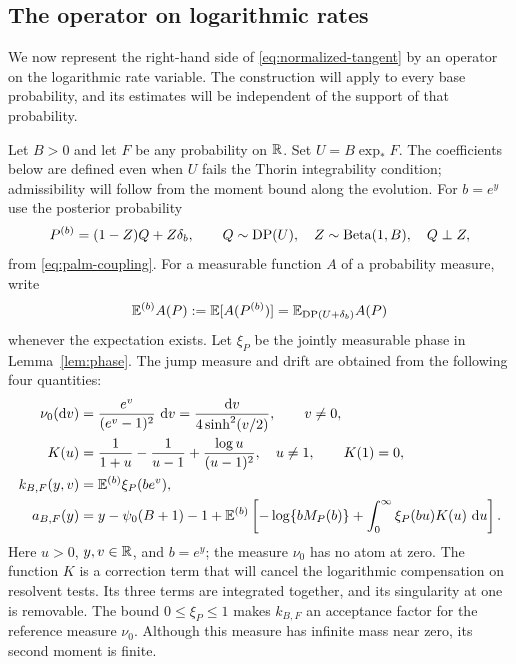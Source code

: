 \subsection{The operator on logarithmic rates}
\label{sec:generator}

We now represent the right-hand side of \eqref{eq:normalized-tangent} by an operator on the logarithmic rate variable.
The construction will apply to every base probability, and its estimates will be independent of the support of that probability.

Let $B>0$ and let $F$ be any probability on $\mathbb R$.
Set $U=B\exp_*F$.
The coefficients below are defined even when $U$ fails the Thorin integrability condition; admissibility will follow from the moment bound along the evolution.
For $b=e^y$ use the posterior probability
\[
 P^{(b)}=(1-Z)Q+Z\delta_b,\qquad
 Q\sim\operatorname{DP}(U),\quad Z\sim\operatorname{Beta}(1,B),\quad Q\perp Z,
\]
from \eqref{eq:palm-coupling}.
For a measurable function $A$ of a probability measure, write
\[
 \mathbb E^{(b)}A(P):=\mathbb E[A(P^{(b)})]
             =\mathbb E_{\operatorname{DP}(U+\delta_b)}A(P)
\]
whenever the expectation exists.
Let $\xi_P$ be the jointly measurable phase in Lemma~\ref{lem:phase}.
The jump measure and drift are obtained from the following four quantities:
\begin{align}
 \nu_0(\mathop{}\!\mathrm d v)&=\frac{e^v}{(e^v-1)^2}\,\mathop{}\!\mathrm d v
             =\frac{\mathop{}\!\mathrm d v}{4\sinh^2(v/2)},\qquad v\ne0,
             \label{eq:universal-jumps}\\
 K(u)&=\frac1{1+u}-\frac1{u-1}+\frac{\log u}{(u-1)^2},
       \quad u\ne1,\qquad K(1)=0,\label{eq:K}\\
 k_{B,F}(y,v)&=\mathbb E^{(b)}\xi_P(be^v),\label{eq:acceptance}\\
 a_{B,F}(y)&=y-\psi_0(B+1)-1
 +\mathbb E^{(b)}\left[-\log\{bM_P(b)\}
                +\int_0^\infty\xi_P(bu)K(u)\,\mathop{}\!\mathrm d u\right].
 \label{eq:log-drift}
\end{align}
Here $u>0$, $y,v\in\mathbb R$, and $b=e^y$; the measure $\nu_0$ has no atom at zero.
The function $K$ is a correction term that will cancel the logarithmic compensation on resolvent tests.
Its three terms are integrated together, and its singularity at one is removable.
The bound $0\le\xi_P\le1$ makes $k_{B,F}$ an acceptance factor for the reference measure $\nu_0$.
Although this measure has infinite mass near zero, its second moment is finite.

